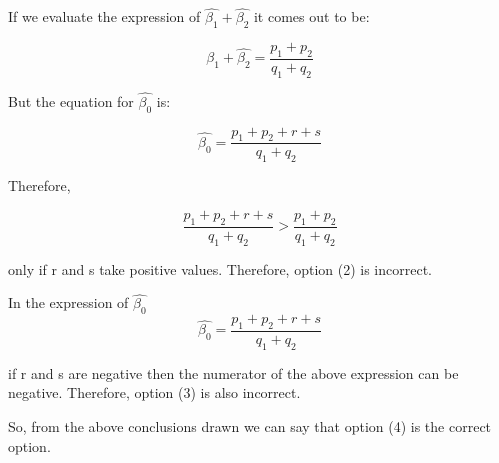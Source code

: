 \documentclass[12pt]{article}
\begin{document}
\noindent If we evaluate the expression of $\hat{\beta_1} + \hat{\beta_2}$ it comes out to be:

$$
\hat{\beta_1} + \hat{\beta_2} = \dfrac{p_1 + p_2}{q_1 + q_2}
$$

\noindent But the equation for $\hat{\beta_0}$ is:

$$
\hat{\beta_0} = \dfrac{p_1 + p_2 + r + s}{q_1 + q_2}
$$

\noindent Therefore, 

$$
\dfrac{p_1 + p_2 + r + s}{q_1 + q_2} > \dfrac{p_1 + p_2}{q_1 + q_2}
$$

\noindent only if r and s take positive values. Therefore, option (2) is incorrect.

\noindent In the expression of $\hat{\beta_0}$ 
$$
\hat{\beta_0} = \dfrac{p_1 + p_2 + r + s}{q_1 + q_2}
$$

\noindent if r and s are negative then the numerator of the above expression can be negative. Therefore, option (3) is also incorrect. 

\noindent So, from the above conclusions drawn we can say that option (4) is the correct option.
\end{document}
